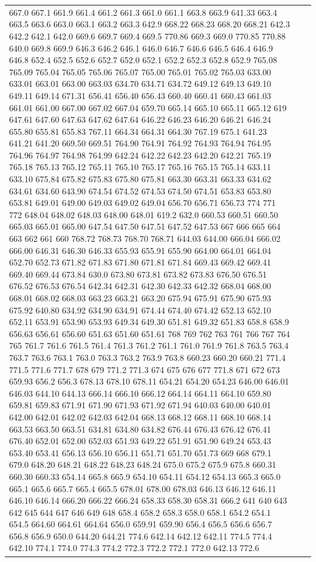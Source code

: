 \documentclass[3p,super,numbers,sort&compress,preprint,10pt]{elsarticle}
\begin{document}
\begin{longtable}{|L{.1in}|L{.6in}||L{5.65in}|}
667.0 667.1 661.9 661.4 661.2 661.3 661.0 661.1 663.8 663.9 641.33 663.4 663.5 663.6 663.0 663.1 663.2 663.3 642.9 668.22 668.23 668.20 668.21 642.3 642.2 642.1 642.0 669.6 669.7 669.4 669.5 770.86 669.3 669.0 770.85 770.88 640.0 669.8 669.9 646.3 646.2 646.1 646.0 646.7 646.6 646.5 646.4 646.9 646.8 652.4 652.5 652.6 652.7 652.0 652.1 652.2 652.3 652.8 652.9 765.08 765.09 765.04 765.05 765.06 765.07 765.00 765.01 765.02 765.03 633.00 633.01 663.01 663.00 663.03 634.70 634.71 634.72 649.12 649.13 649.10 649.11 649.14 671.31 656.41 656.40 656.43 660.40 660.41 660.43 661.03 661.01 661.00 667.00 667.02 667.04 659.70 665.14 665.10 665.11 665.12 619 647.61 647.60 647.63 647.62 647.64 646.22 646.23 646.20 646.21 646.24 655.80 655.81 655.83 767.11 664.34 664.31 664.30 767.19 675.1 641.23 641.21 641.20 669.50 669.51 764.90 764.91 764.92 764.93 764.94 764.95 764.96 764.97 764.98 764.99 642.24 642.22 642.23 642.20 642.21 765.19 765.18 765.13 765.12 765.11 765.10 765.17 765.16 765.15 765.14 633.11 633.10 675.84 675.82 675.83 675.80 675.81 663.30 663.31 663.33 634.62 634.61 634.60 643.90 674.54 674.52 674.53 674.50 674.51 653.83 653.80 653.81 649.01 649.00 649.03 649.02 649.04 656.70 656.71 656.73 774 771 772 648.04 648.02 648.03 648.00 648.01 619.2 632.0 660.53 660.51 660.50 665.03 665.01 665.00 647.54 647.50 647.51 647.52 647.53 667 666 665 664 663 662 661 660 768.72 768.73 768.70 768.71 644.03 644.00 666.04 666.02 666.00 646.31 646.30 646.33 655.93 655.91 655.90 664.00 664.01 664.04 652.70 652.73 671.82 671.83 671.80 671.81 671.84 669.43 669.42 669.41 669.40 669.44 673.84 630.0 673.80 673.81 673.82 673.83 676.50 676.51 676.52 676.53 676.54 642.34 642.31 642.30 642.33 642.32 668.04 668.00 668.01 668.02 668.03 663.23 663.21 663.20 675.94 675.91 675.90 675.93 675.92 640.80 634.92 634.90 634.91 674.44 674.40 674.42 652.13 652.10 652.11 653.91 653.90 653.93 649.34 649.30 651.81 649.32 651.83 658.8 658.9 656.63 656.61 656.60 651.63 651.60 651.61 768 769 762 763 761 766 767 764 765 761.7 761.6 761.5 761.4 761.3 761.2 761.1 761.0 761.9 761.8 763.5 763.4 763.7 763.6 763.1 763.0 763.3 763.2 763.9 763.8 660.23 660.20 660.21 771.4 771.5 771.6 771.7 678 679 771.2 771.3 674 675 676 677 771.8 671 672 673 659.93 656.2 656.3 678.13 678.10 678.11 654.21 654.20 654.23 646.00 646.01 646.03 644.10 644.13 666.14 666.10 666.12 664.14 664.11 664.10 659.80 659.81 659.83 671.91 671.90 671.93 671.92 671.94 640.03 640.00 640.01 642.00 642.01 642.02 642.03 642.04 668.13 668.12 668.11 668.10 668.14 663.53 663.50 663.51 634.81 634.80 634.82 676.44 676.43 676.42 676.41 676.40 652.01 652.00 652.03 651.93 649.22 651.91 651.90 649.24 653.43 653.40 653.41 656.13 656.10 656.11 651.71 651.70 651.73 669 668 679.1 679.0 648.20 648.21 648.22 648.23 648.24 675.0 675.2 675.9 675.8 660.31 660.30 660.33 654.14 665.8 665.9 654.10 654.11 654.12 654.13 665.3 665.0 665.1 665.6 665.7 665.4 665.5 678.01 678.00 678.03 646.13 646.12 646.11 646.10 646.14 666.20 666.22 666.24 658.33 658.30 658.31 666.2 641 640 643 642 645 644 647 646 649 648 658.4 658.2 658.3 658.0 658.1 654.2 654.1 654.5 664.60 664.61 664.64 656.0 659.91 659.90 656.4 656.5 656.6 656.7 656.8 656.9 650.0 644.20 644.21 774.6 642.14 642.12 642.11 774.5 774.4 642.10 774.1 774.0 774.3 774.2 772.3 772.2 772.1 772.0 642.13 772.6 
\end{longtable}
\end{document}

